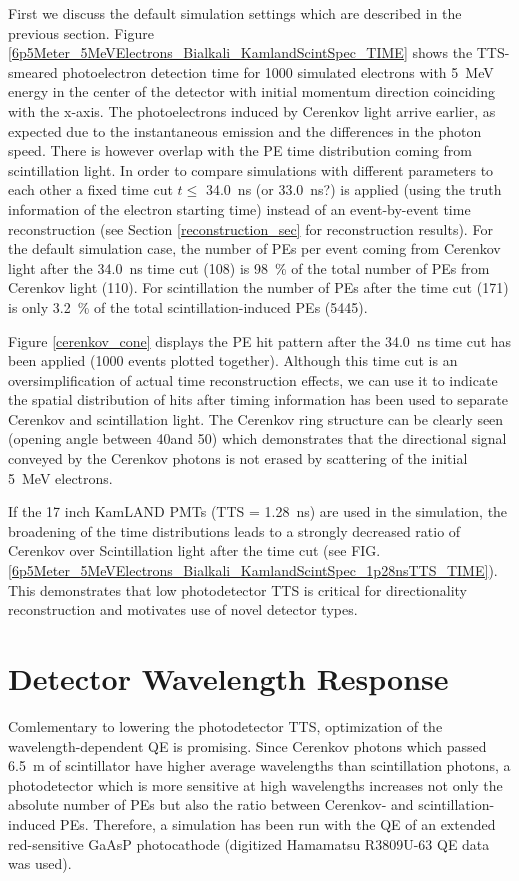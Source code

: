\documentclass[aps,prc,twocolumn,groupedaddress,showpacs,amsmath,amssymb,floatfix,superscriptaddress]{revtex4}
\begin{document}
First we discuss the default simulation settings which are described in the previous section. Figure \ref{6p5Meter_5MeVElectrons_Bialkali_KamlandScintSpec_TIME} shows the TTS-smeared photoelectron detection time for 1000 simulated electrons with 5~MeV energy in the center of the detector with initial momentum direction coinciding with the x-axis. The photoelectrons induced by Cerenkov light arrive earlier, as expected due to the instantaneous emission and the differences in the photon speed. There is however overlap with the PE time distribution coming from scintillation light. In order to compare simulations with different parameters to each other a fixed time cut $t \leq$ 34.0~ns (or 33.0~ns?) is applied (using the truth information of the electron starting time) instead of an event-by-event time reconstruction (see Section \ref{reconstruction_sec} for reconstruction results). For the default simulation case, the number of PEs per event coming from Cerenkov light after the 34.0~ns time cut (108) is 98~\% of the total number of PEs from Cerenkov light (110). For scintillation the number of PEs after the time cut (171) is only 3.2~\% of the total scintillation-induced PEs (5445).  

Figure \ref{cerenkov_cone} displays the PE hit pattern after the 34.0~ns time cut has been applied (1000 events plotted together). Although this time cut is an oversimplification of actual time reconstruction effects, we can use it to indicate the spatial distribution of hits after timing information has been used to separate Cerenkov and scintillation light. The Cerenkov ring structure can be clearly seen (opening angle between 40\textdegree and 50\textdegree) which demonstrates that the directional signal conveyed by the Cerenkov photons is not erased by scattering of the initial 5~MeV electrons.  

If the 17 inch KamLAND PMTs \cite{tbd} (TTS = 1.28~ns) are used in the simulation, the broadening of the time distributions leads to a strongly decreased ratio of Cerenkov over Scintillation light after the time cut (see FIG. \ref{6p5Meter_5MeVElectrons_Bialkali_KamlandScintSpec_1p28nsTTS_TIME}). This demonstrates that low photodetector TTS is critical for directionality reconstruction and motivates use of novel detector types.  

\section{Detector Wavelength Response}
\label{detector_wavelength_response_sec} 
Comlementary to lowering the photodetector TTS, optimization of the wavelength-dependent QE is promising. Since Cerenkov photons which passed 6.5~m of scintillator have higher average wavelengths than scintillation photons, a photodetector which is more sensitive at high wavelengths increases not only the absolute number of PEs but also the ratio between Cerenkov- and scintillation-induced PEs. Therefore, a simulation has been run with the QE of an extended red-sensitive GaAsP photocathode (digitized Hamamatsu R3809U-63 QE data was used).
\end{document}
